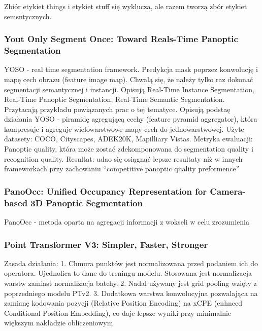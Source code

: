 \documentclass[
]{article}
\begin{document}
Zbiór etykiet things i etykiet stuff się wyklucza, ale razem tworzą zbór etykiet semsntycznych.

\subsubsection{Yout Only Segment Once: Toward Reals-Time Panoptic Segmentation}\label{yout-only-segment-once-toward-reals-time-panoptic-segmentation}

YOSO - real time segmentation framework. Predykcja mask poprzez konwolucję i mapę cech obrazu (feature image map). Chwalą się, że należy tylko raz dokonać segmentacji semantycznej i instancji.
Opisują Real-Time Instance Segmentation, Real-Time Panoptic Segmentation, Real-Time Semantic Segmentation. Przytacają przykładu powiązanych prac o tej tematyce.
Opisują podstaę działania YOSO - piramidę agregującą cechy (feature pyramid aggregator), która kompresuje i agreguje wielowarstwowe mapy cech do jednowarstwowej.
Użyte datasety: COCO, Cityscapes, ADEK20K, Mapilliary Vistas.
Metryka ewaluacji: Panoptic quality, która może zostać zdekomponowana do segmentation quality i recognition quality.
Resultat: udao się osiągnąć lepsze resultaty niż w innych frameworkach przy zachowaniu ``competitive panoptic quality preformence''

\subsubsection{PanoOcc: Unified Occupancy Representation for Camera-based 3D Panoptic Segmentation}\label{panoocc-unified-occupancy-representation-for-camera-based-3d-panoptic-segmentation}

PanoOcc - metoda oparta na agregacji informacji z wokseli w celu zrozumienia

\subsubsection{Point Transformer V3: Simpler, Faster, Stronger}\label{point-transformer-v3-simpler-faster-stronger}

Zasada działania:
1. Chmura punktów jest normalizowana przed podaniem ich do operatora. Ujednolica to dane do treningu modelu. Stosowana jest normalizacja warstw zamiast normalizacja batchy.
2. Nadal używany jest grid pooling wzięty z poprzedniego modelu PTv2.
3. Dodatkowa warstwa konwolucyjna pozwalająca na zamianę kodowania pozycji (Relative Position Encoding) na xCPE (enhnced Conditional Position Embedding), co daje lepsze wyniki przy minimalnie większym nakładzie obliczeniowym
\end{document}
